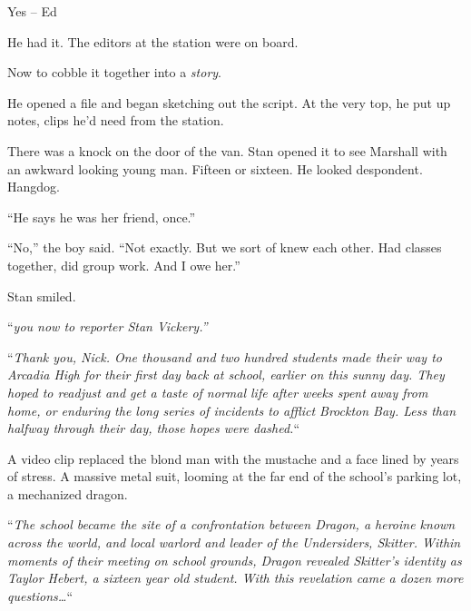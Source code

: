 Yes – Ed



He had it.  The editors at the station were on board.



Now to cobble it together into a \emph{story}.



He opened a file and began sketching out the script.  At the very top, he put up notes, clips he'd need from the station.



There was a knock on the door of the van.  Stan opened it to see Marshall with an awkward looking young man.  Fifteen or sixteen.  He looked despondent.  Hangdog.



``He says he was her friend, once.''



``No,'' the boy said.  ``Not exactly.  But we sort of knew each other.  Had classes together, did group work.  And I owe her.''



Stan smiled.



\blacksquare



``\emph{\ldotstake you now to reporter Stan Vickery.''}



``\emph{Thank you, Nick.  One thousand and two hundred students made their way to Arcadia High for their first day back at school, earlier on this sunny day.  They hoped to readjust and get a taste of normal life after weeks spent away from home, or enduring the long series of incidents to afflict Brockton Bay.  Less than halfway through their day, those hopes were dashed.}``



A video clip replaced the blond man with the mustache and a face lined by years of stress.  A massive metal suit, looming at the far end of the school's parking lot, a mechanized dragon.



``\emph{The school became the site of a confrontation between Dragon, a heroine known across the world, and local warlord and leader of the Undersiders, Skitter.  Within moments of their meeting on school grounds, Dragon revealed Skitter's identity as Taylor Hebert, a sixteen year old student.  With this revelation came a dozen more questions\ldots}``



